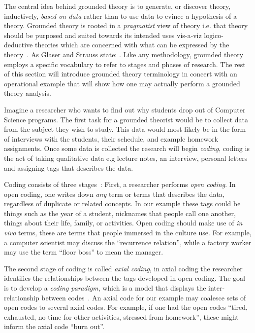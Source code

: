 \documentclass[sigconf]{acmart}
\begin{document}
The central idea behind grounded theory is to generate, or discover theory,
inductively, \emph{based on data} rather than to use data to evince a hypothesis
of a theory. Grounded theory is rooted in a \emph{pragmatist} view of theory
i.e. that theory should be purposed and suited towards its intended uses
vis-a-viz logico-deductive theories which are concerned with what can be
expressed by the theory~\cite{Strauss67discoveryof}. As Glaser and Strauss
state:
\newline
\newline
{}.
\newline
\newline
Like any methodology, grounded theory employs a specific vocabulary to refer to
stages and phases of research. The rest of this section will introduce grounded theory
terminology in concert with an operational example that will show how one may
actually perform a grounded theory analysis.


Imagine a researcher who wants to find out why students drop out of
Computer Science programs. The first task for a grounded theorist would be to
collect data from the subject they wish to study. This data would most likely be
in the form of interviews with the students, their schedule, and example
homework assignments. Once some data is collected the research will begin
\emph{coding}, coding is the act of taking qualitative data e.g lecture notes,
an interview, personal letters and assigning tags that describes the data.
 
Coding consists of three stages~\cite{corbin2014basics}: First, a researcher
performs \emph{open coding}. In open coding, one writes down \emph{any} term or
terms that describes the data, regardless of duplicate or related concepts. In
our example these tags could be things such as the year of a student, nicknames
that people call one another, things about their life, family, or activities.
Open coding should make use of \emph{in vivo} terms, these are terms that people
immersed in the culture use. For example, a computer scientist may discuss the
``recurrence relation'', while a factory worker may use the term ``floor boss''
to mean the manager.
 
The second stage of coding is called \emph{axial coding}, in axial coding the
researcher identifies the relationships between the tags developed in open
coding. The goal is to develop a \emph{coding paradigm}, which is a model that
displays the inter-relationship between codes~\cite{corbin2014basics}. An axial
code for our example may coalesce sets of open codes to several axial codes. For
example, if one had the open codes ``tired, exhausted, no time for other
activities, stressed from homework'', these might inform the axial code ``burn
out''.
 
\end{document}
